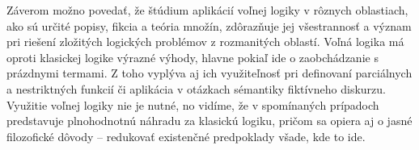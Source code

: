 \documentclass[12pt, letterpaper]{article}
\begin{document}

Záverom možno povedať, že štúdium aplikácií voľnej logiky v rôznych oblastiach, ako sú určité popisy, fikcia a teória množín, zdôrazňuje jej všestrannosť a význam pri riešení zložitých logických problémov z rozmanitých oblastí. Voľná logika má oproti klasickej logike výrazné výhody, hlavne pokiaľ ide o zaobchádzanie s prázdnymi termami. Z toho vyplýva aj ich využiteľnosť pri definovaní parciálnych a nestriktných funkcií či aplikácia v otázkach sémantiky fiktívneho diskurzu. Využitie voľnej logiky nie je nutné, no vidíme, že v spomínaných prípadoch predstavuje plnohodnotnú náhradu za klasickú logiku, pričom sa opiera aj o jasné filozofické dôvody -- redukovať existenčné predpoklady všade, kde to ide.

\end{document}

